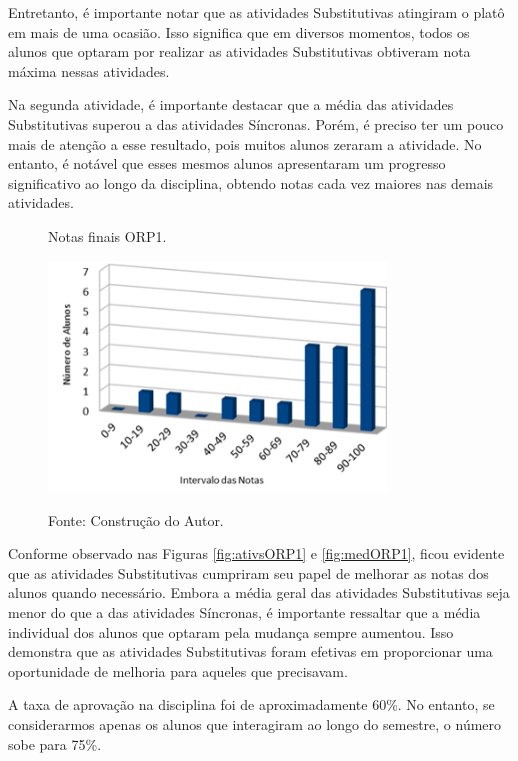 Entretanto, é importante notar que as atividades Substitutivas atingiram o platô em mais de uma ocasião. Isso significa que em diversos momentos, todos os alunos que optaram por realizar as atividades Substitutivas obtiveram nota máxima nessas atividades.

Na segunda atividade, é importante destacar que a média das atividades Substitutivas superou a das atividades Síncronas. Porém, é preciso ter um pouco mais de atenção a esse resultado, pois muitos alunos zeraram a atividade. No entanto, é notável que esses mesmos alunos apresentaram um progresso significativo ao longo da disciplina, obtendo notas cada vez maiores nas demais atividades.

\begin{figure}[ht]
\begin{center}
\caption{Notas finais ORP1.}
\includegraphics[width=0.8\textwidth]{fig/nfORP1.png}
\label{fig:nfORP1}
\caption*{Fonte: Construção do Autor.}
\end{center}
\end{figure}

Conforme observado nas Figuras \ref{fig:ativsORP1} e \ref{fig:medORP1}, ficou evidente que as atividades Substitutivas cumpriram seu papel de melhorar as notas dos alunos quando necessário. Embora a média geral das atividades Substitutivas seja menor do que a das atividades Síncronas, é importante ressaltar que a média individual dos alunos que optaram pela mudança sempre aumentou. Isso demonstra que as atividades Substitutivas foram efetivas em proporcionar uma oportunidade de melhoria para aqueles que precisavam.

A taxa de aprovação na disciplina foi de aproximadamente 60\%. No entanto, se considerarmos apenas os alunos que interagiram ao longo do semestre, o número sobe para 75\%.

